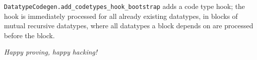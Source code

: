 \begin{isabellebody}
\begin{isamarkuptext}
\begin{description}
  \item \verb|DatatypeCodegen.add_codetypes_hook_bootstrap| adds a code
     type hook;  the hook is immediately processed for all already
     existing datatypes, in blocks of mutual recursive datatypes,
     where all datatypes a block depends on are processed before
     the block.

  \end{description}

  \emph{Happy proving, happy hacking!}%
\end{isamarkuptext}%
\isamarkuptrue%
%
\isadelimtheory
%
\endisadelimtheory
%
\isatagtheory
{}\isamarkupfalse%
%
\endisatagtheory
{\isafoldtheory}%
%
\isadelimtheory
%
\endisadelimtheory
\isanewline
\end{isabellebody}%
